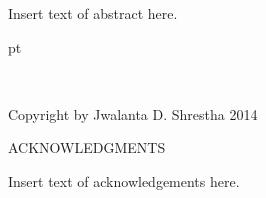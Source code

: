 \documentclass[12pt]{etsu_thesis}
\begin{document}
\noindent 
Insert text of abstract here.

 pt

\newpage

\begin{center}

\ \ \

\vspace{3.in}

Copyright by
Jwalanta D. Shrestha 2014

\end{center}

\newpage





\begin{center}
 ACKNOWLEDGMENTS \\ [.15in]
\end{center}

Insert text of acknowledgements here.



\newpage

\tableofcontents

\newpage

\listoftables


\newpage
\end{document}
